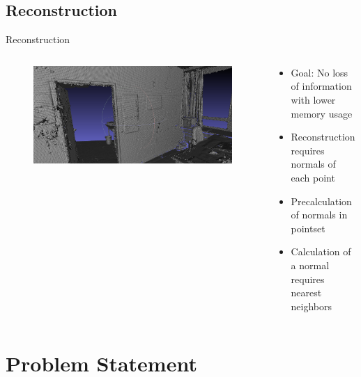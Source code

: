 \documentclass{beamer}
\begin{document}
\subsection*{Reconstruction}
\begin{frame}{Reconstruction}
 
    
  \begin{columns}
  
   \begin{column}{0.55\textwidth}
   
    \begin{figure}
      \centering
   
      \includegraphics[width=1.0\linewidth]{Images/police_mesh.png}
    \end{figure}
    
    
   \end{column}
  \begin{column}{0.45\textwidth}
  
   \begin{itemize}
    \item Goal: No loss of information with lower memory usage
    \item Reconstruction requires normals of each point
    \item Precalculation of normals in pointset
    \item Calculation of a normal requires nearest neighbors
    
   \end{itemize}
  \end{column}

   
  \end{columns}
 
\end{frame}

\section{Problem Statement}
\end{document}
